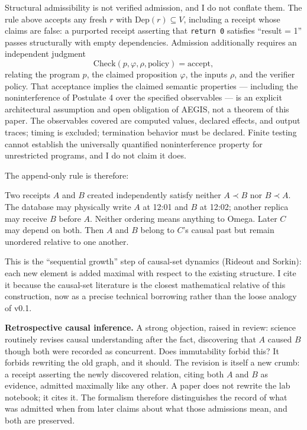\documentclass[11pt]{article}
\begin{document}
Structural admissibility is not verified admission, and I do not conflate them. The rule above accepts any fresh $r$ with $\mathrm{Dep}(r) \subseteq V$, including a receipt whose claims are false: a purported receipt asserting that \texttt{return 0} satisfies ``result = 1'' passes structurally with empty dependencies. Admission additionally requires an independent judgment
\[
\mathrm{Check}(p, \varphi, \rho, \mathrm{policy}) = \mathrm{accept},
\]
relating the program $p$, the claimed proposition $\varphi$, the inputs $\rho$, and the verifier policy. That acceptance implies the claimed semantic properties --- including the noninterference of Postulate 4 over the specified observables --- is an explicit architectural assumption and open obligation of AEGIS, not a theorem of this paper. The observables covered are computed values, declared effects, and output traces; timing is excluded; termination behavior must be declared. Finite testing cannot establish the universally quantified noninterference property for unrestricted programs, and I do not claim it does.

The append-only rule is therefore:

\begin{center}
\end{center}

Two receipts $A$ and $B$ created independently satisfy neither $A \prec B$ nor $B \prec A$. The database may physically write $A$ at 12:01 and $B$ at 12:02; another replica may receive $B$ before $A$. Neither ordering means anything to Omega. Later $C$ may depend on both. Then $A$ and $B$ belong to $C$'s causal past but remain unordered relative to one another.

This is the ``sequential growth'' step of causal-set dynamics (Rideout and Sorkin): each new element is added maximal with respect to the existing structure. I cite it because the causal-set literature is the closest mathematical relative of this construction, now as a precise technical borrowing rather than the loose analogy of v0.1.

\textbf{Retrospective causal inference.} A strong objection, raised in review: science routinely revises causal understanding after the fact, discovering that $A$ caused $B$ though both were recorded as concurrent. Does immutability forbid this? It forbids rewriting the old graph, and it should. The revision is itself a new crumb: a receipt asserting the newly discovered relation, citing both $A$ and $B$ as evidence, admitted maximally like any other. A paper does not rewrite the lab notebook; it cites it. The formalism therefore distinguishes the record of what was admitted when from later claims about what those admissions mean, and both are preserved.
\end{document}
